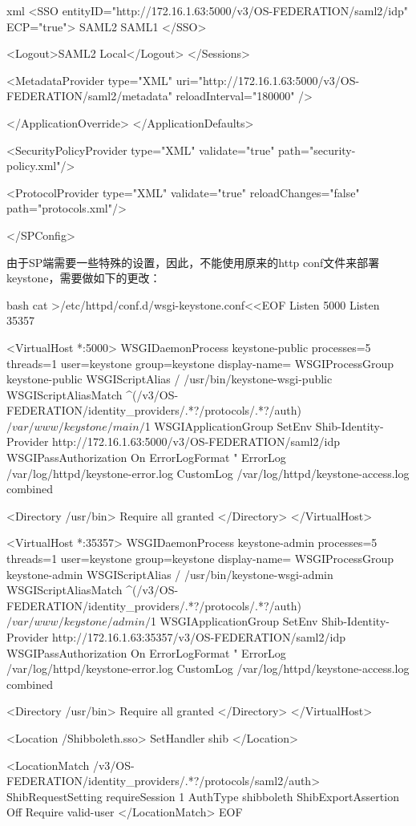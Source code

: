 \begin{code-block}{xml}
            <SSO entityID="http://172.16.1.63:5000/v3/OS-FEDERATION/saml2/idp" ECP="true">
                SAML2 SAML1
            </SSO>

            <Logout>SAML2 Local</Logout>
           </Sessions>

           <MetadataProvider type="XML" uri="http://172.16.1.63:5000/v3/OS-FEDERATION/saml2/metadata"
             reloadInterval="180000" />

        </ApplicationOverride>
    </ApplicationDefaults>

    <SecurityPolicyProvider type="XML" validate="true" path="security-policy.xml"/>

    <ProtocolProvider type="XML" validate="true" reloadChanges="false" path="protocols.xml"/>

</SPConfig>
\end{code-block}

由于SP端需要一些特殊的设置，因此，不能使用原来的http conf文件来部署keystone，需要做如下的更改：
\begin{code-block}{bash}
cat >/etc/httpd/conf.d/wsgi-keystone.conf<<EOF
Listen 5000
Listen 35357

<VirtualHost *:5000>
    WSGIDaemonProcess keystone-public processes=5 threads=1 user=keystone group=keystone display-name=%
    WSGIProcessGroup keystone-public
    WSGIScriptAlias / /usr/bin/keystone-wsgi-public
    WSGIScriptAliasMatch ^(/v3/OS-FEDERATION/identity_providers/.*?/protocols/.*?/auth)$ /var/www/keystone/main/$1
    WSGIApplicationGroup %
    SetEnv Shib-Identity-Provider http://172.16.1.63:5000/v3/OS-FEDERATION/saml2/idp
    WSGIPassAuthorization On
    ErrorLogFormat "%
    ErrorLog /var/log/httpd/keystone-error.log
    CustomLog /var/log/httpd/keystone-access.log combined

    <Directory /usr/bin>
        Require all granted
    </Directory>
</VirtualHost>

<VirtualHost *:35357>
    WSGIDaemonProcess keystone-admin processes=5 threads=1 user=keystone group=keystone display-name=%
    WSGIProcessGroup keystone-admin
    WSGIScriptAlias / /usr/bin/keystone-wsgi-admin
    WSGIScriptAliasMatch ^(/v3/OS-FEDERATION/identity_providers/.*?/protocols/.*?/auth)$ /var/www/keystone/admin/$1
    WSGIApplicationGroup %
    SetEnv Shib-Identity-Provider http://172.16.1.63:35357/v3/OS-FEDERATION/saml2/idp
    WSGIPassAuthorization On
    ErrorLogFormat "%
    ErrorLog /var/log/httpd/keystone-error.log
    CustomLog /var/log/httpd/keystone-access.log combined

    <Directory /usr/bin>
        Require all granted
    </Directory>
</VirtualHost>

<Location /Shibboleth.sso>
    SetHandler shib
</Location>

<LocationMatch /v3/OS-FEDERATION/identity_providers/.*?/protocols/saml2/auth>
    ShibRequestSetting requireSession 1
    AuthType shibboleth
    ShibExportAssertion Off
    Require valid-user
</LocationMatch>
EOF
\end{code-block}

